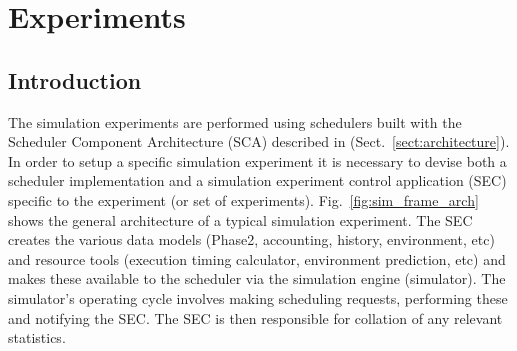 \section{Experiments}
\label{sect:experiments}
\subsection{Introduction}
The simulation experiments are performed using schedulers built with the Scheduler Component Architecture (SCA) described in (Sect.~\ref{sect:architecture}). In order to setup a specific simulation experiment it is necessary to devise both a scheduler implementation and a simulation experiment control application (SEC) specific to the experiment (or set of experiments). Fig.~\ref{fig:sim_frame_arch} shows the general architecture of a typical simulation experiment. The SEC creates the various data models (Phase2, accounting, history, environment, etc) and resource tools (execution timing calculator, environment prediction, etc) and makes these available to the scheduler via the simulation engine (simulator). The simulator's operating cycle involves making scheduling requests, performing these and notifying the SEC. The SEC is then responsible for collation of any relevant statistics.


